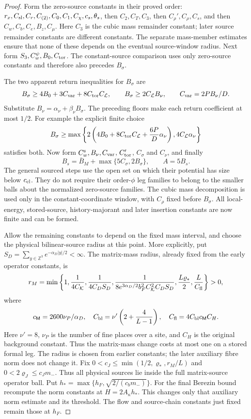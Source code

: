 \documentclass[11pt,letterpaper,reqno]{amsart}
\theoremstyle{definition}
\theoremstyle{remark}
\begin{document}
\begin{proof}
Form the zero-source constants in their proved order:
$r_x,C_{\rm sl},C_r,C_{(2)},C_0,C_1,C_\chi,c_s,\theta_s$,
then $C_2,C_T,C_3$, then $C_\rho',C_\rho,C_s$, and then
$C_w,C_b,C_e,B_z,C_\mu$. Here $C_3$ is the cubic mass
remainder constant; later source remainder constants are
different constants. The separate mass-member estimates
ensure that none of these depends on the eventual source-window
radius. Next form $S_3,C_w^\psi,B_0,C_{\rm tor}$.
The constant-source comparison uses only zero-source
constants and therefore also precedes $B_\sigma$.

The two apparent return inequalities for $B_\sigma$ are
\[
 B_\sigma\ge4B_0+3C_{\rm var}+8C_{\rm tor}C_{\mathcal L},
 \qquad B_\sigma\ge2C_{\mathcal L}B_\nu,
 \qquad C_{\rm var}=2PB_\nu/D.
\]
Substitute $B_\nu=\alpha_\nu+\beta_\nu B_\sigma$.
The preceding floors make each return coefficient at most
$1/2$. For example the explicit finite choice
\[
 B_\sigma\ge\max\left\{
 2\left(4B_0+8C_{\rm tor}C_{\mathcal L}
                         +\frac{6P}D\alpha_\nu\right),
 4C_{\mathcal L}\alpha_\nu\right\}
\]
satisfies both. Now form $C_w^{\rm s},B_\nu,C_{\rm var}$,
$C_{\rm tor}'$, $C_\sigma$ and $C_\nu$, and finally
\[
 B_s=\bar B_M+\max\{5C_\sigma,2B_\sigma\},\qquad A=5B_s.
\]
The general sourced steps use the open set on which their
potential has size below $c_{\rm cl}$. They do not require
their order-$\phi$ leg families to belong to the smaller
balls about the normalized zero-source families. The cubic
mass decomposition is used only in the constant-coordinate
window, with $C_\rho$ fixed before $B_\sigma$.
All local-energy, stored-source, history-majorant and later
insertion constants are now finite and can be formed.

Allow the remaining constants to depend on the fixed mass interval,
and choose the physical bilinear-source radius at this point.
More explicitly, put
$S_D=\sum_{y\in\mathbb Z^3}e^{-\alpha_D|y|/2}<\infty$.
The matrix-mass radius, already fixed from the early operator
constants, is
\[
 r_M=\min\left\{1,\frac1{4C_{\mathcal K}},\frac1{4C_DS_D},
 \frac1{8e^{3\alpha_D/2}b_F^2C_{\mathcal K}^2C_DS_D},
 \frac{L\varrho_*}2,\frac L{C_{\rm fl}}\right\}>0,
\]
where
\[
 c_{\mathsf M}=2600\nu_P/\alpha_D,\quad
 C_{\rm bl}=\nu'\left(2+\frac4{L-1}\right),\quad
 C_{\rm fl}=4C_{\rm bl}c_{\mathsf M}C_H.
\]
Here $\nu'=8$, $\nu_P$ is the number of fine places over a
site, and $C_H$ is the original background constant.
Thus the matrix-mass change costs at most one on a stored
formal leg. The radius is chosen from earlier constants;
the later auxiliary fibre norm does not change it.
Fix $0<c_J\le\min(1/2,\varrho_*,r_M/L)$ and
$0<2\varrho_J\le c_Jm_-$. Thus all physical sources lie
inside the full matrix-source operator ball. Put
$h_*=\max\{h_F,\sqrt{2/(c_bm_-)}\}$.
For the final Berezin bound recompute the norm constants
at $H=2A_\kappa h_*$. This changes only that auxiliary norm
estimate and its threshold. The flow and source-chain
constants just fixed remain those at $h_F$.


\end{proof}
\end{document}
